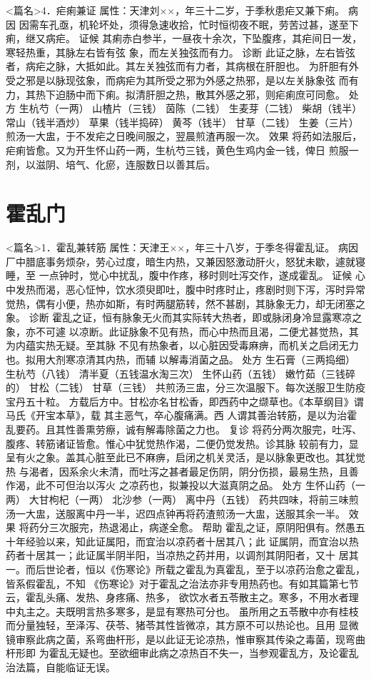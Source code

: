 \documentclass[a4paper,12pt,UTF8,twoside]{ctexbook}
\begin{document}
<篇名>4．疟痢兼证
属性：天津刘××，年三十二岁，于季秋患疟又兼下痢。 
病因 因需车孔亟，机轮坏处，须得急速收拾，忙时恒彻夜不眠，劳苦过甚，遂至下痢，继又病疟。 
证候 其痢赤白参半，一昼夜十余次，下坠腹疼，其疟间日一发，寒轻热重，其脉左右皆有弦 
象，而左关独弦而有力。 
诊断 此证之脉，左右皆弦者，病疟之脉，大抵如此。其左关独弦而有力者，其病根在肝胆也。 
为肝胆有外受之邪是以脉现弦象，而病疟为其所受之邪为外感之热邪，是以左关脉象弦 
而有力，其热下迫肠中而下痢。拟清肝胆之热，散其外感之邪，则疟痢庶可同愈。 
处方 生杭芍（一两） 山楂片（三钱） 茵陈（二钱） 生麦芽（二钱） 
柴胡（钱半） 常山（钱半酒炒） 草果（钱半捣碎） 黄芩（钱半） 甘草（二钱） 生姜（三片） 
煎汤一大盅，于不发疟之日晚间服之，翌晨煎渣再服一次。 
效果 将药如法服后，疟痢皆愈。又为开生怀山药一两，生杭芍三钱，黄色生鸡内金一钱，俾日 
煎服一剂，以滋阴、培气、化瘀，连服数日以善其后。 

\chapter{霍乱门}
<篇名>1．霍乱兼转筋
属性：天津王××，年三十八岁，于季冬得霍乱证。 
病因 厂中腊底事务烦杂，劳心过度，暗生内热，又兼因怒激动肝火，怒犹未歇，遽就寝睡，至 
一点钟时，觉心中扰乱，腹中作疼，移时则吐泻交作，遂成霍乱。 
证候 心中发热而渴，恶心怔忡，饮水须臾即吐，腹中时疼时止，疼剧时则下泻，泻时异常 
觉热，偶有小便，热亦如斯，有时两腿筋转，然不甚剧，其脉象无力，却无闭塞之象。 
诊断 霍乱之证，恒有脉象无火而其实际转大热者，即或脉闭身冷显露寒凉之象，亦不可遽 
以凉断。此证脉象不见有热，而心中热而且渴，二便尤甚觉热，其为内蕴实热无疑。至其脉 
不见有热象者，以心脏因受毒麻痹，而机关之启闭无力也。拟用大剂寒凉清其内热，而辅 
以解毒消菌之品。 
处方 生石膏（三两捣细） 生杭芍（八钱） 清半夏（五钱温水淘三次） 生怀山药（五钱） 
嫩竹茹（三钱碎的） 甘松（二钱） 甘草（三钱） 
共煎汤三盅，分三次温服下。每次送服卫生防疫宝丹五十粒。 
方载后方中。甘松亦名甘松香，即西药中之缬草也。《本草纲目》谓马氏《开宝本草》，载 
其主恶气，卒心腹痛满。西 
人谓其善治转筋，是以为治霍乱要药。且其性善熏劳瘵，诚有解毒除菌之力也。 
复诊 将药分两次服完，吐泻、腹疼、转筋诸证皆愈。惟心中犹觉热作渴，二便仍觉发热。诊其脉 
较前有力，显呈有火之象。盖其心脏至此已不麻痹，启闭之机关灵活，是以脉象更改也。其犹觉热 
与渴者，因系余火未清，而吐泻之甚者最足伤阴，阴分伤损，最易生热，且善作渴，此不可但治以泻火 
之凉药也，拟兼投以大滋真阴之品。 
处方 生怀山药（一两） 大甘枸杞（一两） 北沙参（一两） 离中丹（五钱） 
药共四味，将前三味煎汤一大盅，送服离中丹一半，迟四点钟再将药渣煎汤一大盅，送服其余一半。 
效果 将药分三次服完，热退渴止，病遂全愈。 
帮助 霍乱之证，原阴阳俱有。然愚五十年经验以来，知此证属阳，而宜治以凉药者十居其八；此 
证属阴，而宜治以热药者十居其一；此证属半阴半阳，当凉热之药并用，以调剂其阴阳者，又十 
居其一。而后世论者，恒以《伤寒论》所载之霍乱为真霍乱，至于以凉药治愈之霍乱，皆系假霍乱，不知 
《伤寒论》对于霍乱之治法亦非专用热药也。有如其篇第七节云，霍乱头痛、发热、身疼痛、热多， 
欲饮水者五苓散主之。寒多，不用水者理中丸主之。夫既明言热多寒多，是显有寒热可分也。 
虽所用之五苓散中亦有桂枝而分量独轻，至泽泻、茯苓、猪苓其性皆微凉，其方原不可以热论也。且用 
显微镜审察此病之菌，系弯曲杆形，是以此证无论凉热，惟审察其传染之毒菌，现弯曲杆形即 
为霍乱无疑也。至欲细审此病之凉热百不失一，当参观霍乱方，及论霍乱治法篇，自能临证无误。 
\end{document}
